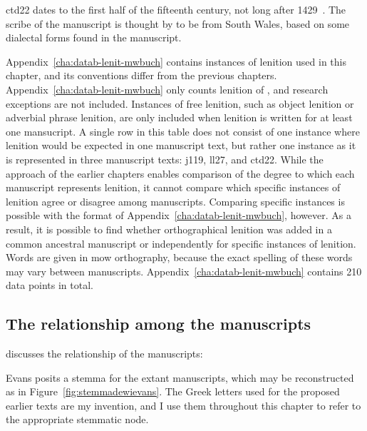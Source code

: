 \Acrfull{ctd22} dates to the first half of the fifteenth century, not long after 1429~\autocite{Eva_Welsh88}. The scribe of the manuscript is thought by \textcite[107]{Pow_description81} to be from South Wales, based on some dialectal forms found in the manuscript.

Appendix~\ref{cha:datab-lenit-mwbuch} contains instances of lenition used in this chapter, and its conventions differ from the previous chapters. Appendix~\ref{cha:datab-lenit-mwbuch} only counts lenition of , and research exceptions are not included. Instances of free lenition, such as object lenition or adverbial phrase lenition, are only included when lenition is written for at least one mansucript.
A single row in this table does not consist of one instance where lenition would be expected in one manuscript text, but rather one instance as it is represented in three manuscript texts: \gls{j119}, \gls{ll27}, and \gls{ctd22}. While the approach of the earlier chapters enables  comparison of  the degree to which each manuscript represents lenition, it cannot compare which specific instances of lenition agree or disagree among manuscripts. Comparing specific instances is possible with the format of Appendix~\ref{cha:datab-lenit-mwbuch}, however.
As a result, it is possible to find  whether orthographical lenition was added in a common ancestral manuscript or independently for  specific instances of lenition. Words are given in \gls{mow} orthography, because the exact spelling of these words may vary between manuscripts.  Appendix~\ref{cha:datab-lenit-mwbuch} contains 210 data points in total.


\subsection{The relationship among the manuscripts}
\label{sec:relat-betw-manuscr}
\textcite{Eva_Welsh88} discusses the relationship of the manuscripts:

Evans posits a stemma for the extant manuscripts, which may be reconstructed as in Figure~\ref{fig:stemmadewievans}. The Greek letters used for the proposed earlier texts are my invention, and I use them throughout this chapter to refer to the appropriate stemmatic node.

